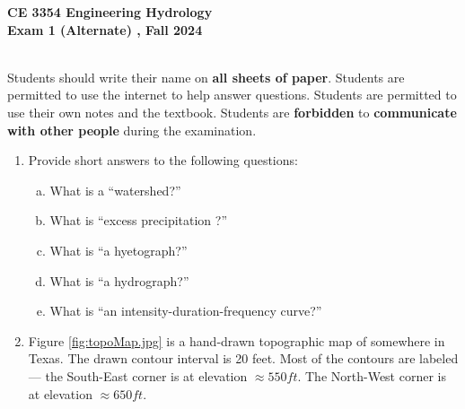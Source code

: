 \documentclass[12pt]{article}
\begin{document}
\begingroup
\begin{centering}
\textbf{CE 3354 Engineering Hydrology} \\
\textbf{Exam 1 (Alternate) , Fall 2024}\\
\end{centering}
~\\
Students should write their name on \textbf{all sheets of paper}.  \newline 
Students are permitted to use the internet to help answer questions.  \newline 
Students are permitted to use their own notes and the textbook.\newline 
Students are \textbf{forbidden} to \textbf{communicate with other people} during the examination.
\endgroup

\begin{enumerate}
\item Provide short answers to the following questions:
\begin{enumerate}[a)]
\item What is a ``watershed?''
~\newline
~\newline
~\newline
~\newline
\item What is ``excess precipitation ?''
~\newline 
~\newline
~\newline
~\newline
~\newline
\item  What is ``a hyetograph?''
~\newline
~\newline
~\newline
~\newline
~\newline
\item What is  ``a hydrograph?''
~\newline
~\newline
~\newline
~\newline
~\newline
\item What is ``an intensity-duration-frequency curve?''
~\newline
~\newline
~\newline
~\newline
~\newline
\end{enumerate}
\clearpage
\item  Figure \ref{fig:topoMap.jpg} is a hand-drawn topographic map of somewhere in Texas.  The drawn contour interval is 20 feet.  Most of the contours are labeled --- the South-East corner is at elevation $\approx{} 550 ft$.  The North-West corner is at elevation $\approx{} 650 ft$.   
\\


\end{enumerate}
\end{document}
